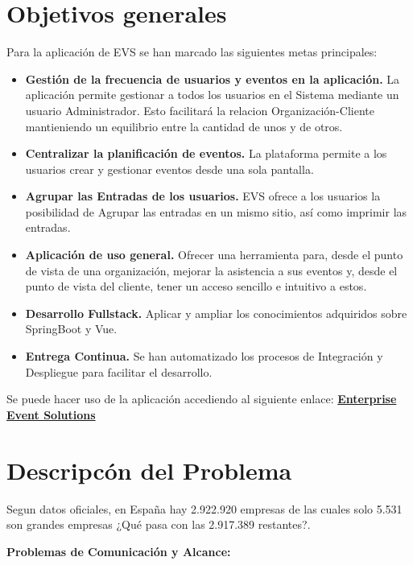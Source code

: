 
\section{Objetivos generales}

Para la aplicación de EVS se han marcado las siguientes metas principales:
\begin{itemize}
    \item \textbf{Gestión de la frecuencia de usuarios y eventos en la aplicación.} La aplicación permite gestionar a todos los usuarios en el Sistema
    mediante un usuario Administrador. Esto facilitará la relacion Organización-Cliente mantieniendo un equilibrio entre la cantidad de unos y de otros.
    \item \textbf{Centralizar la planificación de eventos.} La plataforma permite a los usuarios crear y gestionar eventos desde una sola pantalla.
    \item \textbf{Agrupar las Entradas de los usuarios.}  EVS ofrece a los usuarios la posibilidad de Agrupar las entradas en un mismo sitio, así como imprimir las entradas.
    \item \textbf{Aplicación de uso general.} Ofrecer una herramienta para, desde el punto de vista de una organización, mejorar la asistencia a sus eventos
    y, desde el punto de vista del cliente, tener un acceso sencillo e intuitivo a estos.
    \item \textbf{Desarrollo Fullstack.} Aplicar y ampliar los conocimientos adquiridos sobre SpringBoot y Vue.
    \item \textbf{Entrega Continua.} Se han automatizado los procesos de Integración y Despliegue para facilitar el desarrollo.
    \end{itemize}
   
    Se puede hacer uso de la aplicación accediendo al siguiente enlace: \textbf{\href{https://18.133.60.104:8443/}{Enterprise Event Solutions}}

\section{Descripcón del Problema}
Segun datos oficiales, en España hay 2.922.920 empresas de las cuales solo  5.531 son grandes empresas \cite{pymes} ¿Qué pasa con las 2.917.389 restantes?.

\textbf{Problemas de Comunicación y Alcance:}

